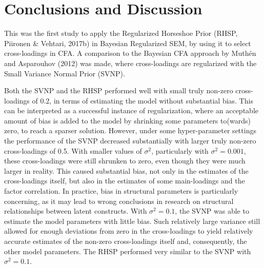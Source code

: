 \documentclass[
  man, donotrepeattitle,floatsintext]{apa6}
\begin{document}
\hypertarget{conclusions-and-discussion}{%
\section{Conclusions and Discussion}\label{conclusions-and-discussion}}

This was the first study to apply the Regularized Horseshoe Prior (RHSP, Piironen \& Vehtari, 2017b) in Bayesian Regularized SEM, by using it to select cross-loadings in CFA. A comparison to the Bayesian CFA approach by Muthén and Asparouhov (2012) was made, where cross-loadings are regularized with the Small Variance Normal Prior (SVNP).

Both the SVNP and the RHSP performed well with small truly non-zero cross-loadings of 0.2, in terms of estimating the model without substantial bias. This can be interpreted as a successful instance of regularization, where an acceptable amount of bias is added to the model by shrinking some parameters to(wards) zero, to reach a sparser solution. However, under some hyper-parameter settings the performance of the SVNP decreased substantially with larger truly non-zero cross-loadings of 0.5. With smaller values of \(\sigma^2\), particularly with \(\sigma^2 = 0.001\), these cross-loadings were still shrunken to zero, even though they were much larger in reality. This caused substantial bias, not only in the estimates of the cross-loadings itself, but also in the estimates of some main-loadings and the factor correlation. In practice, bias in structural parameters is particularly concerning, as it may lead to wrong conclusions in research on structural relationships between latent constructs. With \(\sigma^2 = 0.1\), the SVNP was able to estimate the model parameters with little bias. Such relatively large variance still allowed for enough deviations from zero in the cross-loadings to yield relatively accurate estimates of the non-zero cross-loadings itself and, consequently, the other model parameters. The RHSP performed very similar to the SVNP with \(\sigma^2 = 0.1\).
\end{document}
